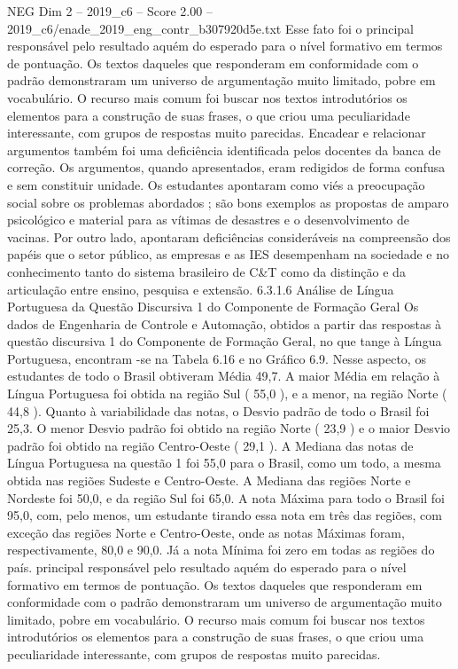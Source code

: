 \begin{textsample}{NEG Dim 2 – 2019\_c6 – Score 2.00 – 2019\_c6/enade\_2019\_eng\_contr\_b307920d5e.txt}
Esse fato foi o principal responsável pelo resultado aquém do esperado para o nível formativo em termos de pontuação.
Os textos daqueles que responderam em conformidade com o padrão demonstraram um universo de argumentação muito limitado, pobre em vocabulário.
O recurso mais comum foi buscar nos textos introdutórios os elementos para a construção de suas frases, o que criou uma peculiaridade interessante, com grupos de respostas muito parecidas.
Encadear e relacionar argumentos também foi uma deficiência identificada pelos docentes da banca de correção.
Os argumentos, quando apresentados, eram redigidos de forma confusa e sem constituir unidade.
Os estudantes apontaram como viés a preocupação social sobre os problemas abordados ; são bons exemplos as propostas de amparo psicológico e material para as vítimas de desastres e o desenvolvimento de vacinas.
Por outro lado, apontaram deficiências consideráveis na compreensão dos papéis que o setor público, as empresas e as IES desempenham na sociedade e no conhecimento tanto do sistema brasileiro de C\&T como da distinção e da articulação entre ensino, pesquisa e extensão. 6.3.1.6 Análise de Língua Portuguesa da Questão Discursiva 1 do Componente de Formação Geral Os dados de Engenharia de Controle e Automação, obtidos a partir das respostas à questão discursiva 1 do Componente de Formação Geral, no que tange à Língua Portuguesa, encontram -se na Tabela 6.16 e no Gráfico 6.9.
Nesse aspecto, os estudantes de todo o Brasil obtiveram Média 49,7.
A maior Média em relação à Língua Portuguesa foi obtida na região Sul ( 55,0 ), e a menor, na região Norte ( 44,8 ).
Quanto à variabilidade das notas, o Desvio padrão de todo o Brasil foi 25,3.
O menor Desvio padrão foi obtido na região Norte ( 23,9 ) e o maior Desvio padrão foi obtido na região Centro-Oeste ( 29,1 ).
A Mediana das notas de Língua Portuguesa na questão 1 foi 55,0 para o Brasil, como um todo, a mesma obtida nas regiões Sudeste e Centro-Oeste.
A Mediana das regiões Norte e Nordeste foi 50,0, e da região Sul foi 65,0.
A nota Máxima para todo o Brasil foi 95,0, com, pelo menos, um estudante tirando essa nota em três das regiões, com exceção das regiões Norte e Centro-Oeste, onde as notas Máximas foram, respectivamente, 80,0 e 90,0.
Já a nota Mínima foi zero em todas as regiões do país. principal responsável pelo resultado aquém do esperado para o nível formativo em termos de pontuação.
Os textos daqueles que responderam em conformidade com o padrão demonstraram um universo de argumentação muito limitado, pobre em vocabulário.
O recurso mais comum foi buscar nos textos introdutórios os elementos para a construção de suas frases, o que criou uma peculiaridade interessante, com grupos de respostas muito parecidas.

\end{textsample}
